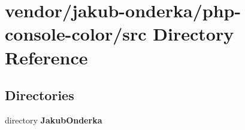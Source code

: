 \section{vendor/jakub-\/onderka/php-\/console-\/color/src Directory Reference}
\label{dir_5726896ff4074fa8a78888bb0cc10d56}
\subsection*{Directories}
\begin{DoxyCompactItemize}
\item 
directory {\bf Jakub\+Onderka}
\end{DoxyCompactItemize}
